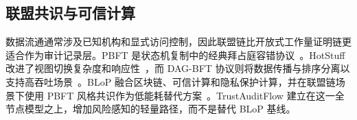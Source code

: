 \subsection{联盟共识与可信计算}

数据流通通常涉及已知机构和显式访问控制，因此联盟链比开放式工作量证明链更适合作为审计记录层。PBFT 是状态机复制中的经典拜占庭容错协议~\cite{castro_practical_2002}。HotStuff 改进了视图切换复杂度和响应性~\cite{yin_hotstuff_2019}，而 DAG-BFT 协议则将数据传播与排序分离以支持高吞吐场景~\cite{danezis_narwhal_2022,spiegelman_bullshark_2022}。BLoP 融合区块链、可信计算和隐私保护计算，并在联盟链场景下使用 PBFT 风格共识作为低能耗替代方案~\cite{Zhang2025BloPAT}。TrustAuditFlow 建立在这一全节点模型之上，增加风险感知的轻量路径，而不是替代 BLoP 基线。

